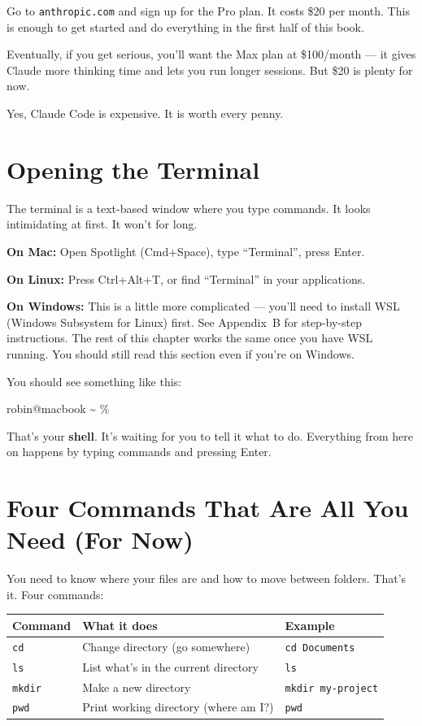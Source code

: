 \documentclass[11pt,a4paper]{article}
\begin{document}
Go to \texttt{anthropic.com} and sign up for the Pro plan. It costs \$20 per month. This is enough to get started and do everything in the first half of this book.

Eventually, if you get serious, you'll want the Max plan at \$100/month --- it gives Claude more thinking time and lets you run longer sessions. But \$20 is plenty for now.

Yes, Claude Code is expensive. It is worth every penny.

\section{Opening the Terminal}

The terminal is a text-based window where you type commands. It looks intimidating at first. It won't for long.

\textbf{On Mac:} Open Spotlight (Cmd+Space), type ``Terminal'', press Enter.

\textbf{On Linux:} Press Ctrl+Alt+T, or find ``Terminal'' in your applications.

\textbf{On Windows:} This is a little more complicated --- you'll need to install WSL (Windows Subsystem for Linux) first. See Appendix~B for step-by-step instructions. The rest of this chapter works the same once you have WSL running. You should still read this section even if you're on Windows.

You should see something like this:

\begin{tcolorbox}[termbox]
robin@macbook \textasciitilde{} \%
\end{tcolorbox}

That's your \textbf{shell}. It's waiting for you to tell it what to do. Everything from here on happens by typing commands and pressing Enter.

\section{Four Commands That Are All You Need (For Now)}

You need to know where your files are and how to move between folders. That's it. Four commands:

\begin{center}
\begin{tabular}{lll}
\textbf{Command} & \textbf{What it does} & \textbf{Example} \\
\hline
\texttt{cd} & Change directory (go somewhere) & \texttt{cd Documents} \\
\texttt{ls} & List what's in the current directory & \texttt{ls} \\
\texttt{mkdir} & Make a new directory & \texttt{mkdir my-project} \\
\texttt{pwd} & Print working directory (where am I?) & \texttt{pwd} \\
\end{tabular}
\end{center}
\end{document}
